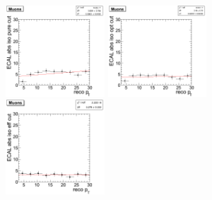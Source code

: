 \begin{figure}[htbp]
   \includegraphics[width = 0.33\textwidth]{pictures/optIsoCut/ecalIso_muon_pure.png}
   \includegraphics[width = 0.33\textwidth]{pictures/optIsoCut/ecalIso_muon_opt.png}
   \includegraphics[width = 0.33\textwidth]{pictures/optIsoCut/ecalIso_muon_eff.png}
   \label{fig:optEcalIso_muon}
\end{figure}

